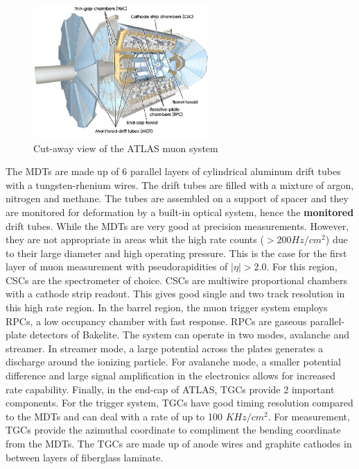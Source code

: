 \begin{figure}[h]
\begin{center}
\includegraphics*[width=0.60\textwidth] {figures/muonsys}
\caption[tile readout]{Cut-away view of the ATLAS muon system \cite{Love:2011qua}}
\label{fig:tile}
\end{center}
\end{figure}

\indent The MDTs are made up of 6 parallel layers of cylindrical aluminum drift tubes with a tungsten-rhenium wires. The drift tubes are filled with a mixture of argon, nitrogen and methane. The tubes are assembled on a support of spacer and they are monitored for deformation by a built-in optical system, hence the \textbf{monitored} drift tubes. \linebreak
\indent While the MDTs are very good at precision measurements. However, they are not appropriate in areas whit the high rate counts (${> 200 Hz/cm^{2}}$) due to their large diameter and high operating pressure. This is the case for the first layer of muon measurement with pseudorapidities of ${|\eta{}|>2.0}$. For this region, CSCs are the spectrometer of choice. CSCs are multiwire proportional chambers with a cathode strip readout. This gives good single and two track resolution in this high rate region.\linebreak
\indent In the barrel region, the muon trigger system employs RPCs, a low occupancy chamber with fast response. RPCs are gaseous parallel-plate detectors of Bakelite. The system can operate in two modes, avalanche and streamer.  In streamer mode, a large potential across the plates generates a discharge around the ionizing particle. For avalanche mode, a smaller potential difference and large signal amplification in the electronics allows for increased rate capability.\linebreak
\indent Finally, in the end-cap of ATLAS, TGCs provide 2 important components. For the trigger system, TGCs have good timing resolution compared to the MDTs and can deal with a rate of up to 100 ${KHz/cm^{2}}$. For measurement, TGCs provide the azimuthal coordinate to compliment the bending coordinate from the MDTs. The TGCs are made up of anode wires and graphite cathodes in between layers of fiberglass laminate. 
